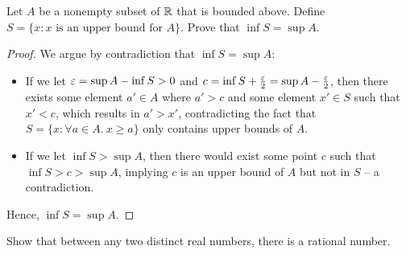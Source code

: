 \begin{problem}\label{prob:inf-of-upper-bounds-is-sup}
  Let $A$ be a nonempty subset of $\mathbb{R}$ that is bounded above. Define 
  $S = \{ x : x \text{ is an upper bound for } A \}$. Prove that $\inf S = \sup A$.
\end{problem}

\begin{proof}
  We argue by contradiction that $\inf S = \sup A$:
  \begin{itemize}
    \item If we let $\varepsilon = \sup A - \inf S > 0$ and $c = \inf S +
      \frac{\varepsilon}{2} = \sup A - \frac{\varepsilon}{2}$, then there exists some
      element $a' \in A$ where $a' > c$ and some element $x' \in S$ such that $x' < c$, which
      results in $a' > x'$, contradicting the fact that $S = \{ x : \forall a \in A.\ x \geq a \}$ 
      only contains upper bounds of $A$.
    \item If we let $\inf S > \sup A$, then there would exist some point $c$ such that $\inf S > c > \sup A$, 
      implying $c$ is an upper bound of $A$ but not in $S$ -- a contradiction.
  \end{itemize}
  Hence, $\inf S = \sup A$.
\end{proof}

\begin{problem}\label{prob:density-rationals-in-reals}
  Show that between any two distinct real numbers, there is a rational number.
\end{problem}

